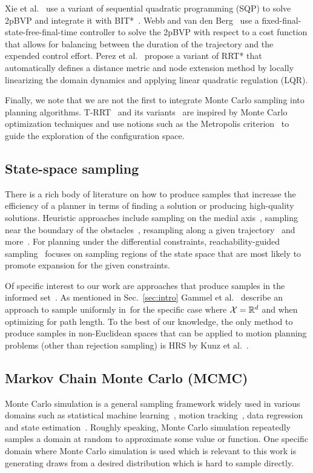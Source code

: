 \documentclass[letterpaper, 10 pt, conference]{ieeeconf}  %
\begin{document}
Xie et al.~\cite{XBPA15} use a variant of sequential quadratic programming (SQP) to solve 2pBVP and integrate it with BIT*~\cite{GSB15}.
Webb and van den Berg~\cite{WB13} use a fixed-final-state-free-final-time controller to solve the 2pBVP  with respect to a cost function that allows for balancing between the duration of the trajectory and the expended control effort.
Perez et al.~\cite{PPKKL12} propose a variant of RRT* that automatically defines a distance metric and node extension method by locally linearizing
the domain dynamics and applying linear quadratic regulation (LQR).

Finally, we note that we are not the first to integrate Monte Carlo sampling into planning algorithms. T-RRT~\cite{JCS10} and its variants~\cite{DSC13} are inspired by Monte Carlo optimization techniques and use notions such as the Metropolis criterion~\cite{CG95} to guide the exploration of the configuration space.


\subsection{State-space sampling}
\label{subsec:sampling}
There is a rich body of literature on how to produce samples that increase the efficiency of a planner in terms of finding a solution or producing high-quality solutions.
Heuristic approaches include
sampling on the medial axis~\cite{WAS99a, WAS99b, LTA03, YDLTA14},
sampling near the boundary of the obstacles~\cite{ABDJV98, YTEA12},
resampling along a given trajectory~\cite{APD11, AS11}
and more~\cite{US03, SWT09}.
For planning under the differential constraints,
reachability-guided sampling~\cite{SWT09, PLAEFRA17} focuses on sampling regions of the state space that are most likely to promote expansion for the given constraints.


Of specific interest to our work are approaches that produce samples in the informed set~\Cinf.
As mentioned in Sec.~\ref{sec:intro} Gammel et al.~\cite{GSB14} describe an approach to sample uniformly in~\Cinf for the specific case where $\mathcal{X} = \mathbb{R}^d$ and when optimizing for path length.
To the best of our knowledge, the only method to produce samples in non-Euclidean spaces that can be  applied to motion planning problems (other than rejection sampling) is HRS by Kunz et al.~\cite{KTC16}.

\subsection{Markov Chain Monte Carlo (MCMC)}
\label{subsec:mcmc}
Monte Carlo simulation is a general sampling framework widely used in various domains such as
statistical machine learning~\cite{M97},
motion tracking~\cite{KBD04}, 
data regression~\cite{TL11} and 
state estimation~\cite{ASC13}.
Roughly speaking, Monte Carlo simulation repeatedly samples a domain at random to approximate some value or function.
One specific domain where Monte Carlo simulation is used which is relevant to this work is generating draws from a desired distribution which is hard to sample directly.
\end{document}
